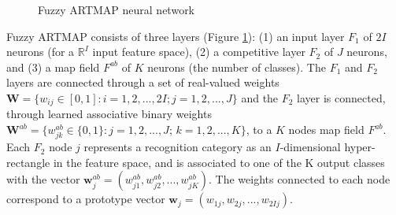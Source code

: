 \begin{figure}[!t]
  \centering
  \caption{Fuzzy ARTMAP neural network}
	\label{fig:c1_fam}
\end{figure}

Fuzzy ARTMAP consists of three layers (Figure \ref{fig:c1_fam}): (1) an input layer $F_1$ of $2I$ neurons (for a $\mathbb{R}^I$ input feature space), (2) a competitive layer $F_2$ of $J$ neurons, and (3) a map field $F^{ab}$ of $K$ neurons (the number of classes). The $F_1$ and $F_2$ layers are connected through a set of real-valued weights $\textbf{W} = \{w_{ij} \in [0,1] : i = 1, 2, ..., 2I; j = 1, 2, ..., J\}$ and the $F_2$ layer is connected, through learned associative binary weights $\textbf{W}^{ab} = \{w^{ab}_{jk} \in \{0,1\} : j = 1, 2, ..., J;\, k = 1, 2, ..., K\}$, to a $K$ nodes map field $F^{ab}$. Each $F_2$ node $j$ represents a recognition category as an $I$-dimensional hyper-rectangle in the feature space, and is associated to one of the K output classes with the vector $\textbf{w}^{ab}_j = (w^{ab}_{j1}, w^{ab}_{j2}, ..., w^{ab}_{jK})$. The weights connected to each node correspond to a prototype vector $\textbf{w}_j = (w_{1j}, w_{2j},..., w_{2Ij})$.

